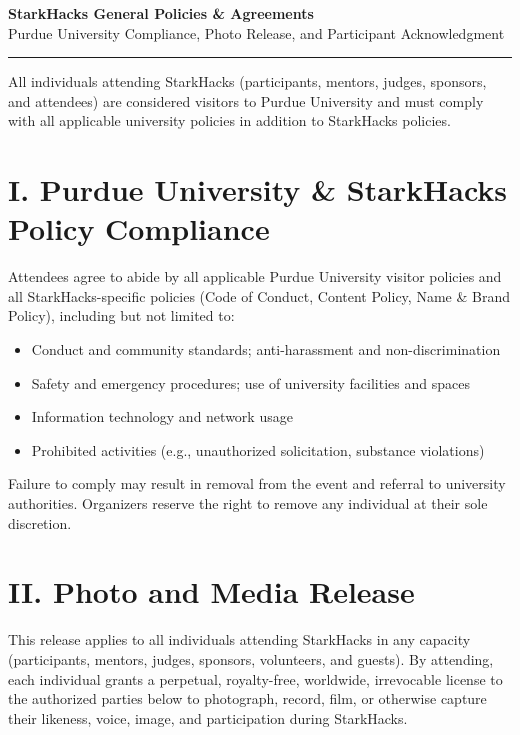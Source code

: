\documentclass[9pt,letterpaper]{article}
\begin{document}
\begin{center}
    {\large\bfseries StarkHacks General Policies \& Agreements}\\[2pt]
    {\footnotesize Purdue University Compliance, Photo Release, and Participant Acknowledgment}
\end{center}

\vspace{2pt}\hrule\vspace{4pt}

All individuals attending StarkHacks (participants, mentors, judges, sponsors, and attendees) are considered visitors to Purdue University and must comply with all applicable university policies in addition to StarkHacks policies.

\section{I. Purdue University \& StarkHacks Policy Compliance}

Attendees agree to abide by all applicable Purdue University visitor policies and all StarkHacks-specific policies (Code of Conduct, Content Policy, Name \& Brand Policy), including but not limited to:
\begin{itemize}[nosep, leftmargin=*, topsep=2pt]
    \item Conduct and community standards; anti-harassment and non-discrimination
    \item Safety and emergency procedures; use of university facilities and spaces
    \item Information technology and network usage
    \item Prohibited activities (e.g., unauthorized solicitation, substance violations)
\end{itemize}

Failure to comply may result in removal from the event and referral to university authorities. Organizers reserve the right to remove any individual at their sole discretion.

\section{II. Photo and Media Release}

This release applies to all individuals attending StarkHacks in any capacity (participants, mentors, judges, sponsors, volunteers, and guests). By attending, each individual grants a perpetual, royalty-free, worldwide, irrevocable license to the authorized parties below to photograph, record, film, or otherwise capture their likeness, voice, image, and participation during StarkHacks.
\end{document}
